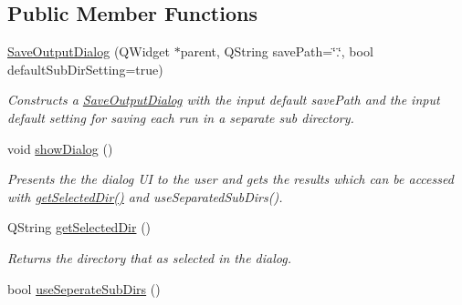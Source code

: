 \subsection*{Public Member Functions}
\begin{DoxyCompactItemize}
\item 
\hypertarget{class_save_output_dialog_afea7bb5cab6b702a34753c498806854e}{\hyperlink{class_save_output_dialog_afea7bb5cab6b702a34753c498806854e}{Save\-Output\-Dialog} (Q\-Widget $\ast$parent, Q\-String save\-Path=\char`\"{}.\char`\"{}, bool default\-Sub\-Dir\-Setting=true)}\label{class_save_output_dialog_afea7bb5cab6b702a34753c498806854e}

\begin{DoxyCompactList}\small\item\em Constructs a \hyperlink{class_save_output_dialog}{Save\-Output\-Dialog} with the input default save\-Path and the input default setting for saving each run in a separate sub directory. \end{DoxyCompactList}\item 
\hypertarget{class_save_output_dialog_a4040f42ae9a12d196e689d1bc6d9eb2e}{void \hyperlink{class_save_output_dialog_a4040f42ae9a12d196e689d1bc6d9eb2e}{show\-Dialog} ()}\label{class_save_output_dialog_a4040f42ae9a12d196e689d1bc6d9eb2e}

\begin{DoxyCompactList}\small\item\em Presents the the dialog U\-I to the user and gets the results which can be accessed with \hyperlink{class_save_output_dialog_a3f7bba3a4efe68a2f38e444d68682144}{get\-Selected\-Dir()} and use\-Separated\-Sub\-Dirs(). \end{DoxyCompactList}\item 
\hypertarget{class_save_output_dialog_a3f7bba3a4efe68a2f38e444d68682144}{Q\-String \hyperlink{class_save_output_dialog_a3f7bba3a4efe68a2f38e444d68682144}{get\-Selected\-Dir} ()}\label{class_save_output_dialog_a3f7bba3a4efe68a2f38e444d68682144}

\begin{DoxyCompactList}\small\item\em Returns the directory that as selected in the dialog. \end{DoxyCompactList}\item 
\hypertarget{class_save_output_dialog_a542d237dada5dafeb6e6493a38941292}{bool \hyperlink{class_save_output_dialog_a542d237dada5dafeb6e6493a38941292}{use\-Seperate\-Sub\-Dirs} ()}\label{class_save_output_dialog_a542d237dada5dafeb6e6493a38941292}


\end{DoxyCompactItemize}
